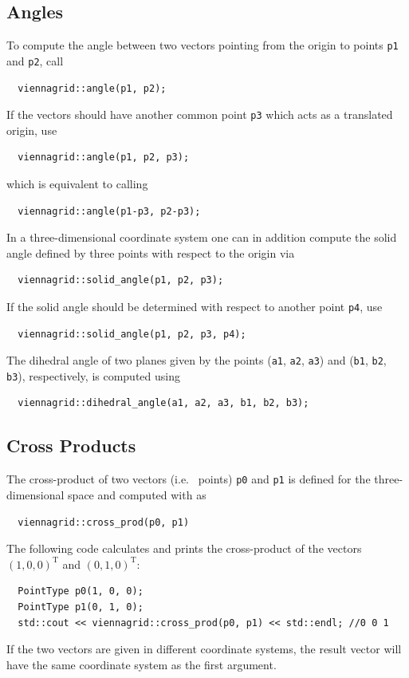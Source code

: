   \subsection{Angles}
 To compute the angle between two vectors pointing from the origin to points \lstinline|p1| and \lstinline|p2|, call
 \begin{lstlisting}
  viennagrid::angle(p1, p2);
 \end{lstlisting}
 If the vectors should have another common point \lstinline|p3| which acts as a translated origin, use
 \begin{lstlisting}
  viennagrid::angle(p1, p2, p3);
 \end{lstlisting}
 which is equivalent to calling
 \begin{lstlisting}
  viennagrid::angle(p1-p3, p2-p3);
 \end{lstlisting}

 In a three-dimensional coordinate system one can in addition compute the solid angle defined by three points with respect to the origin via
 \begin{lstlisting}
  viennagrid::solid_angle(p1, p2, p3);
 \end{lstlisting}
 If the solid angle should be determined with respect to another point \lstinline|p4|, use
 \begin{lstlisting}
  viennagrid::solid_angle(p1, p2, p3, p4);
 \end{lstlisting}

 The dihedral angle of two planes given by the points (\lstinline|a1|, \lstinline|a2|, \lstinline|a3|) and (\lstinline|b1|, \lstinline|b2|, \lstinline|b3|), respectively, is computed using
 \begin{lstlisting}
  viennagrid::dihedral_angle(a1, a2, a3, b1, b2, b3);
 \end{lstlisting}

  \subsection{Cross Products}
 The cross-product of two vectors (i.e.~{\ViennaGrid} points) \lstinline|p0| and \lstinline|p1| is defined for the three-dimensional space and computed with {\ViennaGrid} as
 \begin{lstlisting}
  viennagrid::cross_prod(p0, p1)
 \end{lstlisting}
 The following code calculates and prints the cross-product of the vectors $(1,0,0)^\mathrm{T}$ and $(0,1,0)^\mathrm{T}$:
 \begin{lstlisting}
  PointType p0(1, 0, 0);
  PointType p1(0, 1, 0);
  std::cout << viennagrid::cross_prod(p0, p1) << std::endl; //0 0 1
 \end{lstlisting}
 If the two vectors are given in different coordinate systems, the result vector will have the same coordinate system as the first argument.

